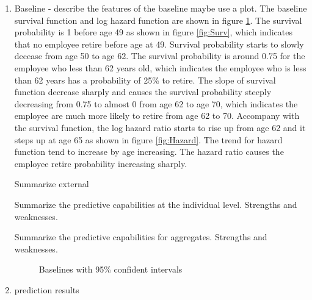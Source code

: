 \documentclass[12pt,letterpaper]{article}
\begin{document}
\begin{enumerate}
\item Baseline - describe the features of the baseline maybe use a plot.
The baseline survival function and log hazard function are shown in figure \ref{fig:basepred}. The survival probability is 1 before age 49 as shown in figure \ref{fig:Surv}, which indicates that no employee retire before age at 49. Survival probability starts to slowly decease from age 50 to age 62. The survival probability is around 0.75 for the employee who less than 62 years old, which indicates the employee who is less than 62 years has a probability of 25\% to retire.  The slope of survival function decrease sharply and causes the survival probability steeply decreasing from 0.75 to almost 0 from age 62 to age 70, which indicates the employee are much more likely to retire from age 62 to 70. Accompany with the survival function, the log hazard ratio starts to rise up from age 62 and it steps up at age 65 as shown in figure \ref{fig:Hazard}. The trend for hazard function tend to increase by age increasing. The hazard ratio causes the employee retire probability increasing sharply.


Summarize external

Summarize the predictive capabilities at the individual level.  Strengths and weaknesses.

Summarize the predictive capabilities for aggregates.  Strengths and weaknesses.
\begin{figure}[h!]
	\centering
	\caption{Baselines with 95\% confident intervals}
	\label{fig:basepred}
\end{figure}
\item prediction results


\end{enumerate}
\end{document}
